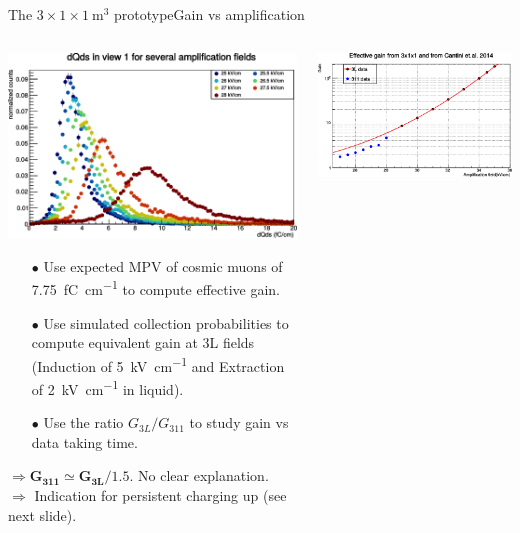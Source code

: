 \documentclass[10pt]{beamer}
\begin{document}
    \begin{frame}{The \texorpdfstring{$3 \times 1 \times \SI{1}{\meter\cubed}$}{311} prototype}{Gain vs amplification}
    	\begin{scriptsize}
	    	\begin{columns}
	    		\begin{column}{0.5\textwidth}
	    			\includegraphics[width=\textwidth]{figures/311/dQds_gain.png}\\
	    			\vfill
	    			\begin{itemize}
	    				\item[$\bullet$] Use expected MPV of cosmic muons of \SI{7.75}{\femto\coulomb\per\centi\meter} to compute effective gain.
	    				\item[$\bullet$] Use simulated collection probabilities to compute equivalent gain at 3L fields (Induction of \SI{5}{\kilo\volt\per\centi\meter} and Extraction of \SI{2}{\kilo\volt\per\centi\meter} in liquid).
	    				\item[$\bullet$] Use the ratio $G_{3L}/G_{311}$ to study gain vs data taking time.
	    			\end{itemize}
	    			$\mathbf{\Rightarrow G_{311} \boldsymbol{\simeq} G_{3L}/1.5}$. No clear explanation.\\
	    			$\Rightarrow$ Indication for persistent charging up (see next slide).\\
	    		\end{column}
	    		\hfill
	    		\begin{column}{0.5\textwidth}
	    			\centering
	    			\includegraphics[width=.9025\textwidth]{figures/311/gain.png}\\

\end{column}
\end{columns}
\end{scriptsize}
\end{frame}
\end{document}

